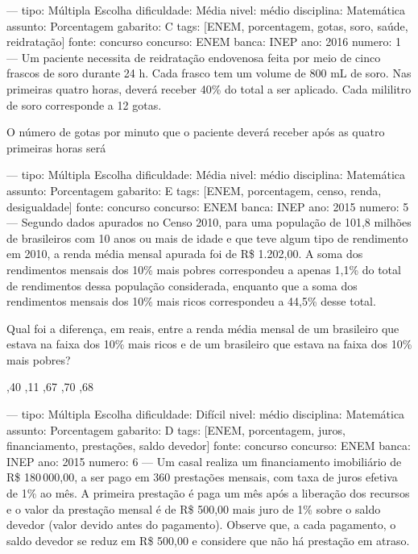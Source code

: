 
---
tipo: Múltipla Escolha
dificuldade: Média
nivel: médio
disciplina: Matemática
assunto: Porcentagem
gabarito: C
tags: [ENEM, porcentagem, gotas, soro, saúde, reidratação]
fonte: concurso
concurso: ENEM
banca: INEP
ano: 2016
numero: 1
---
\question
Um paciente necessita de reidratação endovenosa feita por meio de cinco frascos de soro durante 24 h. Cada frasco tem um volume de 800 mL de soro. Nas primeiras quatro horas, deverá receber 40\% do total a ser aplicado. Cada mililitro de soro corresponde a 12 gotas.

O número de gotas por minuto que o paciente deverá receber após as quatro primeiras horas será
\begin{choices}
\end{choices}

---
tipo: Múltipla Escolha
dificuldade: Média
nivel: médio
disciplina: Matemática
assunto: Porcentagem
gabarito: E
tags: [ENEM, porcentagem, censo, renda, desigualdade]
fonte: concurso
concurso: ENEM
banca: INEP
ano: 2015
numero: 5
---
\question
Segundo dados apurados no Censo 2010, para uma população de 101,8 milhões de brasileiros com 10 anos ou mais de idade e que teve algum tipo de rendimento em 2010, a renda média mensal apurada foi de R\$ 1.202,00. A soma dos rendimentos mensais dos 10\% mais pobres correspondeu a apenas 1,1\% do total de rendimentos dessa população considerada, enquanto que a soma dos rendimentos mensais dos 10\% mais ricos correspondeu a 44,5\% desse total.

Qual foi a diferença, em reais, entre a renda média mensal de um brasileiro que estava na faixa dos 10\% mais ricos e de um brasileiro que estava na faixa dos 10\% mais pobres?
\begin{choices}
,40
,11
,67
,70
,68
\end{choices}

---
tipo: Múltipla Escolha
dificuldade: Difícil
nivel: médio
disciplina: Matemática
assunto: Porcentagem
gabarito: D
tags: [ENEM, porcentagem, juros, financiamento, prestações, saldo devedor]
fonte: concurso
concurso: ENEM
banca: INEP
ano: 2015
numero: 6
---
\question
Um casal realiza um financiamento imobiliário de R\$ 180\,000,00, a ser pago em 360 prestações mensais, com taxa de juros efetiva de 1\% ao mês. A primeira prestação é paga um mês após a liberação dos recursos e o valor da prestação mensal é de R\$ 500,00 mais juro de 1\% sobre o saldo devedor (valor devido antes do pagamento). Observe que, a cada pagamento, o saldo devedor se reduz em R\$ 500,00 e considere que não há prestação em atraso.

